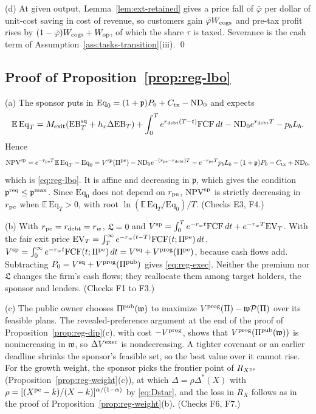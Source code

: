 (d) At given output, Lemma~\ref{lem:ext-retained} gives a price fall of $\bar\varphi$ per dollar of unit-cost saving in cost of revenue, so customers gain $\bar\varphi W_{\rm cogs}$ and pre-tax profit rises by $(1-\bar\varphi)W_{\rm cogs}+W_{\rm op}$, of which the share $\tau$ is taxed. Severance is the cash term of Assumption~\ref{ass:tasks-transition}(iii). \qed

\subsection*{Proof of Proposition~\ref{prop:reg-lbo}}

(a) The sponsor puts in $\mathrm{Eq}_0=(1+\mathfrak p)P_0+C_{\rm tx}-\mathrm{ND}_0$ and expects
\[
\mathbb E\,\mathrm{Eq}_T=M_{\rm exit}(\mathrm{EB}^{\rm sq}_T+h_x\Delta\mathrm{EB}_T)+\int_0^Te^{r_{\rm debt}(T-t)}\mathrm{FCF}\,dt-\mathrm{ND}_0e^{r_{\rm debt}T}-p_bL_b .
\]
Hence
\[
\mathrm{NPV}^{\rm sp}=e^{-r_{\rm pe}T}\mathbb E\,\mathrm{Eq}_T-\mathrm{Eq}_0=V^{\rm sp}(\Pi^{\rm pe})-\mathrm{ND}_0e^{-(r_{\rm pe}-r_{\rm debt})T}-e^{-r_{\rm pe}T}p_bL_b-(1+\mathfrak p)P_0-C_{\rm tx}+\mathrm{ND}_0,
\]
which is \eqref{eq:reg-lbo}. It is affine and decreasing in $\mathfrak p$, which gives the condition $\mathfrak p^{\rm req}\le\mathfrak p^{\max}$. Since $\mathrm{Eq}_0$ does not depend on $r_{\rm pe}$, $\mathrm{NPV}^{\rm sp}$ is strictly decreasing in $r_{\rm pe}$ when $\mathbb E\,\mathrm{Eq}_T>0$, with root $\ln(\mathbb E\,\mathrm{Eq}_T/\mathrm{Eq}_0)/T$. (Checks E3, F4.)

(b) With $r_{\rm pe}=r_{\rm debt}=r_w$, $\mathfrak L=0$ and $V^{\rm sp}=\int_0^Te^{-r_wt}\mathrm{FCF}\,dt+e^{-r_wT}\mathrm{EV}_T$. With the fair exit price $\mathrm{EV}_T=\int_T^\infty e^{-r_w(t-T)}\mathrm{FCF}(t;\Pi^{\rm pe})\,dt$, $V^{\rm sp}=\int_0^\infty e^{-r_wt}\mathrm{FCF}(t;\Pi^{\rm pe})\,dt=V^{\rm sq}+V^{\rm prog}(\Pi^{\rm pe})$, because cash flows add. Subtracting $P_0=V^{\rm sq}+V^{\rm prog}(\Pi^{\rm pub})$ gives \eqref{eq:reg-exec}. Neither the premium nor $\mathfrak L$ changes the firm's cash flows; they reallocate them among target holders, the sponsor and lenders. (Checks F1 to F3.)

(c) The public owner chooses $\Pi^{\rm pub}(\mathfrak w)$ to maximize $V^{\rm prog}(\Pi)-\mathfrak w\mathcal P(\Pi)$ over its feasible plans. The revealed-preference argument at the end of the proof of Proposition~\ref{prop:reg-dip}(c), with cost $-V^{\rm prog}$, shows that $V^{\rm prog}(\Pi^{\rm pub}(\mathfrak w))$ is nonincreasing in $\mathfrak w$, so $\Delta V^{\rm exec}$ is nondecreasing. A tighter covenant or an earlier deadline shrinks the sponsor's feasible set, so the best value over it cannot rise. For the growth weight, the sponsor picks the frontier point of $R_{X^{\rm pe}}$ (Proposition~\ref{prop:reg-weight}(c)), at which $\Delta=\rho\Delta^*(X)$ with $\rho=[(X^{\rm pe}-k)/(X-k)]^{\alpha/(1-\alpha)}$ by \eqref{eq:Dstar}, and the loss in $R_X$ follows as in the proof of Proposition~\ref{prop:reg-weight}(b). (Checks F6, F7.)

